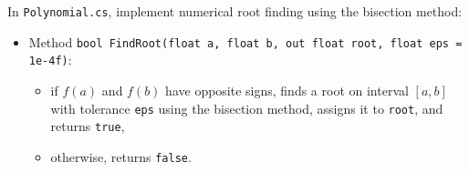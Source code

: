 \documentclass[11pt,a4paper,addpoints]{exam}
\begin{document}
\begin{questions}
\question[2]
In \texttt{Polynomial.cs}, implement numerical root finding using the bisection method:
\begin{itemize}
    \item Method \texttt{bool FindRoot(float a, float b, out float root, float eps = 1e-4f)}:
    \begin{itemize}
        \item if $f(a)$ and $f(b)$ have opposite signs, finds a root on interval $[a, b]$ with tolerance \texttt{eps} using the bisection method, assigns it to \texttt{root}, and returns \texttt{true},
        \item otherwise, returns \texttt{false}.
    \end{itemize}
\end{itemize}

\end{questions}
\end{document}
